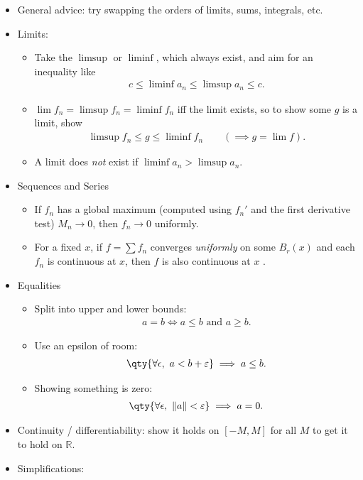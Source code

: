 \begin{itemize}
\item
  General advice: try swapping the orders of limits, sums, integrals,
  etc.
\item
  Limits:

  \begin{itemize}
  \tightlist
  \item
    Take the \(\limsup\) or \(\liminf\), which always exist, and aim for
    an inequality like
    \begin{align*}  
    c \leq \liminf a_n \leq \limsup a_n \leq c
    .\end{align*}
  \item
    \(\lim f_n = \limsup f_n = \liminf f_n\) iff the limit exists, so to
    show some \(g\) is a limit, show
    \begin{align*}  
    \limsup f_n \leq g \leq \liminf f_n \qquad (\implies g = \lim f) 
    .\end{align*}
  \item
    A limit does \emph{not} exist if \(\liminf a_n > \limsup a_n\).
  \end{itemize}
\item
  Sequences and Series

  \begin{itemize}
  \tightlist
  \item
    If \(f_n\) has a global maximum (computed using \(f_n'\) and the
    first derivative test) \(M_n \to 0\), then \(f_n \to 0\) uniformly.
  \item
    For a fixed \(x\), if \(f = \sum f_n\) converges \emph{uniformly} on
    some \(B_r(x)\) and each \(f_n\) is continuous at \(x\), then \(f\)
    is also continuous at \(x\) .
  \end{itemize}
\item
  Equalities

  \begin{itemize}
  \tightlist
  \item
    Split into upper and lower bounds:
    \begin{align*}  
    a=b \iff a\leq b \text{ and }  a\geq b
    .\end{align*}
  \item
    Use an epsilon of room:
    \begin{align*}  
    \qty{ \forall \epsilon, \,\,a < b + {\varepsilon}} \implies a\leq b 
    .\end{align*}
  \item
    Showing something is zero:
    \begin{align*}  
    \qty{ \forall \epsilon, \,\, {\left\lVert {a} \right\rVert} < {\varepsilon}} \implies a = 0
    .\end{align*}
  \end{itemize}
\item
  Continuity / differentiability: show it holds on \([-M, M]\) for all
  \(M\) to get it to hold on \({\mathbb{R}}\).
\item
  Simplifications:


\end{itemize}

